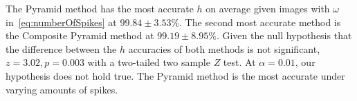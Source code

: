 The Pyramid method has the most accurate $h$ on average given images with $\omega$ in~\autoref{eq:numberOfSpikes}
at $99.84 \pm 3.53\%$.
The second most accurate method is the Composite Pyramid method at $99.19 \pm 8.95\%$.
Given the null hypothesis that the difference between the $h$ accuracies of both methods is not significant,
$z = 3.02, p = 0.003$ with a two-tailed two sample $Z$ test.
At $\alpha = 0.01$, our hypothesis does not hold true.
The Pyramid method is the most accurate under varying amounts of spikes.
